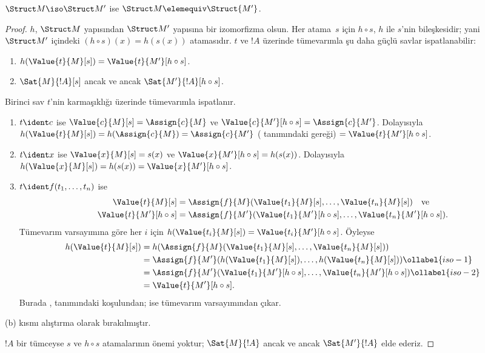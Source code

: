\documentclass[../../../include/open-logic-section]{subfiles}
\begin{document}
\begin{thm}
$\Struct M\iso\Struct M'$ ise $\Struct M\elemequiv\Struct{M'}$.
\end{thm}

\begin{proof}
$h$, $\Struct M$ yapısından $\Struct M'$ yapısına bir izomorfizma
olsun. Her atama~$s$ için $h\circ s$, $h$ ile $s$'nin bileşkesidir;
yani $\Struct M'$ içindeki $(h\circ s)(x)=h(s(x))$ atamasıdır. $t$ ve
$!A$ üzerinde tümevarımla şu daha güçlü savlar ispatlanabilir:
\begin{enumerate}
  \item[a.] $h(\Value{t}{M}[s]) = \Value{t}{M'}[h\circ s]$.
  \item[b.] $\Sat{M}{!A}[s]$ ancak ve ancak
    $\Sat{M'}{!A}[h\circ s]$.
\end{enumerate}
Birinci sav $t$'nin karmaşıklığı üzerinde tümevarımla ispatlanır.
\begin{enumerate}
\item $t\ident c$ ise $\Value{c}{M}[s]=\Assign{c}{M}$ ve
  $\Value{c}{M'}[h\circ s]=\Assign{c}{M'}$. Dolayısıyla
  $h(\Value{t}{M}[s])=h(\Assign{c}{M})=\Assign{c}{M'}$
  ( tanımındaki 
  gereği) $=\Value{t}{M'}[h\circ s]$.
\item $t\ident x$ ise $\Value{x}{M}[s]=s(x)$ ve
  $\Value{x}{M'}[h\circ s]=h(s(x))$. Dolayısıyla
  $h(\Value{x}{M}[s])=h(s(x))=\Value{x}{M'}[h\circ s]$.
\item $t\ident f(t_1,\dots,t_n)$ ise
  \begin{align*}
    \Value{t}{M}[s] & = \Assign{f}{M}(\Value{t_1}{M}[s], \dots, \Value{t_n}{M}[s])
      \quad\text{ve}\\
  \Value{t}{M'}[h \circ s] & = \Assign{f}{M'}(\Value{t_1}{M'}[h \circ
    s], \dots, \Value{t_n}{M'}[h \circ s]).
  \end{align*}
  Tümevarım varsayımına göre her $i$ için
  $h(\Value{t_i}{M}[s])=\Value{t_i}{M'}[h\circ s]$. Öyleyse
  \begin{align}
    h(\Value{t}{M}[s])
    & = h(\Assign{f}{M}(\Value{t_1}{M}[s], \dots, \Value{t_n}{M}[s])) \notag\\
    & = \Assign{f}{M'}(h(\Value{t_1}{M}[s]), \dots,
    h(\Value{t_n}{M}[s])) \ollabel{iso-1}\\
    & = \Assign{f}{M'}(\Value{t_1}{M'}[h \circ s], \dots,
    \Value{t_n}{M'}[h \circ s]) \ollabel{iso-2}\\
    & = \Value{t}{M'}[h\circ s]. \notag
  \end{align}
  Burada ,  tanımındaki
   koşulundan;  ise tümevarım
  varsayımından çıkar.
\end{enumerate}
(b) kısmı alıştırma olarak bırakılmıştır.

$!A$ bir tümceyse $s$ ve $h\circ s$ atamalarının önemi yoktur;
$\Sat{M}{!A}$ ancak ve ancak $\Sat{M'}{!A}$ elde ederiz.
\end{proof}
\end{document}
